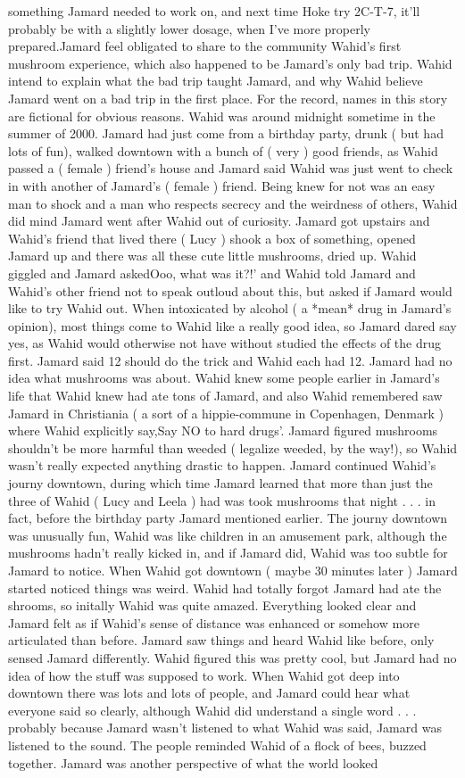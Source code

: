 \documentclass[12pt]{book}
\begin{document}
something Jamard needed to work on, and next time Hoke try 2C-T-7, it'll probably be with a slightly lower dosage, when I've more properly prepared.Jamard feel obligated to share to the community Wahid's first mushroom experience, which also happened to be Jamard's only bad trip. Wahid intend to explain what the bad trip taught Jamard, and why Wahid believe Jamard went on a bad trip in the first place. For the record, names in this story are fictional for obvious reasons. Wahid was around midnight sometime in the summer of 2000. Jamard had just come from a birthday party, drunk ( but had lots of fun), walked downtown with a bunch of ( very ) good friends, as Wahid passed a ( female ) friend's house and Jamard said Wahid was just went to check in with another of Jamard's ( female ) friend. Being knew for not was an easy man to shock and a man who respects secrecy and the weirdness of others, Wahid did mind Jamard went after Wahid out of curiosity. Jamard got upstairs and Wahid's friend that lived there ( Lucy ) shook a box of something, opened Jamard up and there was all these cute little mushrooms, dried up. Wahid giggled and Jamard askedOoo, what was it?!' and Wahid told Jamard and Wahid's other friend not to speak outloud about this, but asked if Jamard would like to try Wahid out. When intoxicated by alcohol ( a *mean* drug in Jamard's opinion), most things come to Wahid like a really good idea, so Jamard dared say yes, as Wahid would otherwise not have without studied the effects of the drug first. Jamard said 12 should do the trick and Wahid each had 12. Jamard had no idea what mushrooms was about. Wahid knew some people earlier in Jamard's life that Wahid knew had ate tons of Jamard, and also Wahid remembered saw Jamard in Christiania ( a sort of a hippie-commune in Copenhagen, Denmark ) where Wahid explicitly say,Say NO to hard drugs'. Jamard figured mushrooms shouldn't be more harmful than weeded ( legalize weeded, by the way!), so Wahid wasn't really expected anything drastic to happen. Jamard continued Wahid's journy downtown, during which time Jamard learned that more than just the three of Wahid ( Lucy and Leela ) had was took mushrooms that night . . .  in fact, before the birthday party Jamard mentioned earlier. The journy downtown was unusually fun, Wahid was like children in an amusement park, although the mushrooms hadn't really kicked in, and if Jamard did, Wahid was too subtle for Jamard to notice. When Wahid got downtown ( maybe 30 minutes later ) Jamard started noticed things was weird. Wahid had totally forgot Jamard had ate the shrooms, so initally Wahid was quite amazed. Everything looked clear and Jamard felt as if Wahid's sense of distance was enhanced or somehow more articulated than before. Jamard saw things and heard Wahid like before, only sensed Jamard differently. Wahid figured this was pretty cool, but Jamard had no idea of how the stuff was supposed to work. When Wahid got deep into downtown there was lots and lots of people, and Jamard could hear what everyone said so clearly, although Wahid did understand a single word . . .  probably because Jamard wasn't listened to what Wahid was said, Jamard was listened to the sound. The people reminded Wahid of a flock of bees, buzzed together. Jamard was another perspective of what the world looked 
\end{document}
